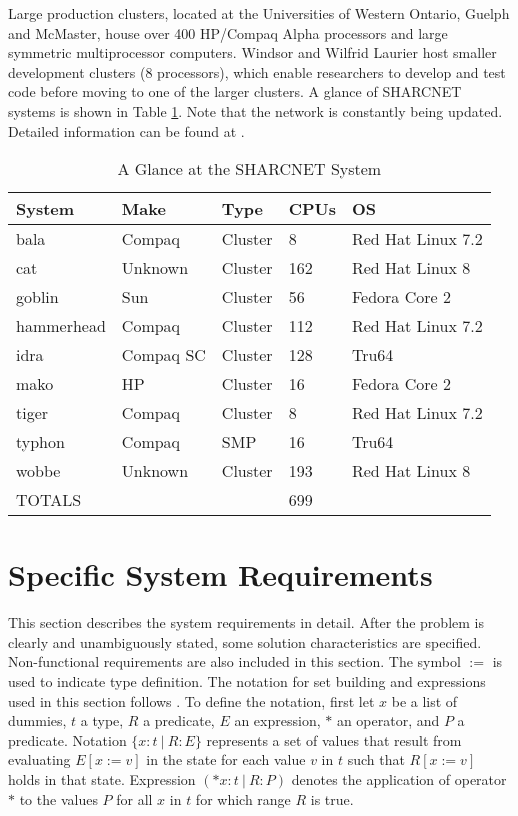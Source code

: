 \documentclass[12pt,titlepage]{article}
\begin{document}
Large production clusters, located at the Universities of Western Ontario, Guelph and McMaster, house over 400 HP/Compaq
Alpha processors and large symmetric multiprocessor computers. Windsor and Wilfrid Laurier host smaller development
clusters (8 processors), which enable researchers to develop and test code before moving to one of the larger clusters.
A glance of SHARCNET systems is shown in Table \ref{AreqSharcnet}. Note that the network is constantly being updated. Detailed information can be found at \citet{sharcnet2006}.
\begin{table}[htbp]
\centering
\begin{tabular}{p{}|p{}|p{}|p{}|p{}} 
\hline \hline
System & Make & Type & CPUs & OS \\
\hline
bala & Compaq & Cluster & 8 & Red Hat Linux 7.2\\
cat & Unknown & Cluster & 162 & Red Hat Linux 8 \\
goblin & Sun & Cluster & 56 & Fedora Core 2 \\
hammerhead & Compaq & Cluster & 112 & Red Hat Linux 7.2 \\
idra & Compaq SC & Cluster & 128 & Tru64 \\
mako & HP & Cluster & 16 & Fedora Core 2 \\
tiger & Compaq & Cluster & 8 & Red Hat Linux 7.2 \\
typhon & Compaq & SMP & 16 & Tru64 \\
wobbe & Unknown & Cluster & 193 & Red Hat Linux 8 \\
TOTALS & & & 699 \\
\hline \hline
\end{tabular} 
\caption{A Glance at the SHARCNET System}
\label{AreqSharcnet}
\end{table}

\section{Specific System Requirements \label{AreqSecSSR}} 

This section describes the system requirements in detail. After the problem is clearly and unambiguously stated, some solution characteristics are specified. Non-functional requirements are also included in this section. The symbol $:=$ is used to indicate type definition. The notation for set building and expressions used in this section follows \citet{Gries1993}. To define the notation, first let $x$ be a list of dummies, $t$ a type, $R$ a predicate, $E$ an expression, $*$ an operator, and $P$ a predicate. Notation $\{ x:t\ |\ R:E\}$ represents a set of values that result from evaluating $E[x:=v]$ in the state for each value $v$ in $t$ such that $R[x:=v]$ holds in that state. Expression $(*x:t\ |\ R:P)$ denotes the application of operator $*$ to the values $P$ for all $x$ in $t$ for which range $R$ is true. 
\end{document}

